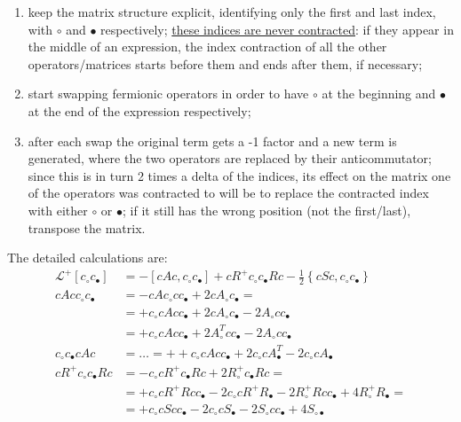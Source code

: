 \documentclass[a4paper,11pt]{article}
\newcommand{\nl}{\vskip 0.3cm}
\newcommand{\ubar}[1]{\underline{#1}}
\begin{document}
  \begin{enumerate}
   \item keep the matrix structure explicit, identifying only the first and last index, with $ \circ$ and $\bullet$ respectively; \ubar{these indices are never contracted}: if they appear in the middle of an expression, the index contraction of all the other operators/matrices starts before them and ends after them, if necessary;
   \item start swapping fermionic operators in order to have $ \circ$ at the beginning and $\bullet$ at the end of the expression respectively; 
   \item after each swap the original term gets a -1 factor and a new term is generated, where the two operators are replaced by their anticommutator; since this is in turn 2 times a delta of the indices, its effect on the matrix one of the operators was contracted to will be to replace the contracted index with either $ \circ$ or $\bullet$; if it still has the wrong position (not the first/last), transpose the matrix.
  \end{enumerate}\nl
  The detailed calculations are:
   \begin{align*}
   \mathcal{L}^+\!\!\left[c^{ }_{\circ}c^{ }_{\bullet}\right] &= - \left[cAc, c^{ }_{\circ} c^{ }_{\bullet}\right] +cR^+c^{ }_{\circ} c^{ }_{\bullet}Rc-\frac{1}{2}\left\{cSc,c^{ }_{\circ}c^{ }_{\bullet}\right\}\\
   cAcc^{ }_{\circ} c^{ }_{\bullet} &=-cAc^{ }_{\circ}cc^{ }_{\bullet} + 2cA^{ }_{\circ} c^{ }_{\bullet} = \\ &=+c^{ }_{\circ}cAc c^{ }_{\bullet} + 2cA^{ }_{\circ} c^{ }_{\bullet} -2 A^{ }_{\circ}cc^{ }_{\bullet}\\ &=+c^{ }_{\circ}cAc c^{ }_{\bullet} + 2A^T_{\circ}c c^{ }_{\bullet}-2 A^{ }_{\circ}cc^{ }_{\bullet}\\
   c^{ }_{\circ} c^{ }_{\bullet} cAc &= \dots = + +c^{ }_{\circ}cAc c^{ }_{\bullet}+2c^{ }_{\circ}c A^T_{\bullet} -2c^{ }_{\circ}cA^{ }_{\bullet} \\  
   cR^+c^{ }_{\circ} c^{ }_{\bullet}Rc &= -c^{ }_{\circ}cR^+c^{ }_{\bullet}Rc + 2R^+_{\circ}c^{ }_{\bullet}Rc = \\
   &=+c^{ }_{\circ}cR^+Rcc^{ }_{\bullet}-2c^{ }_{\circ}cR^+R^{ }_{\bullet}-2R^+_{\circ}Rcc_{\bullet}+4R^+_{\circ}R_{\bullet}=\\
   &=+c^{ }_{\circ}cScc^{ }_{\bullet}-2c^{ }_{\circ}cS^{ }_{\bullet}-2S^{ }_{\circ}cc^{ }_{\bullet}+4S^{ }_{\circ\bullet}
   \end{align*}
\end{document}
